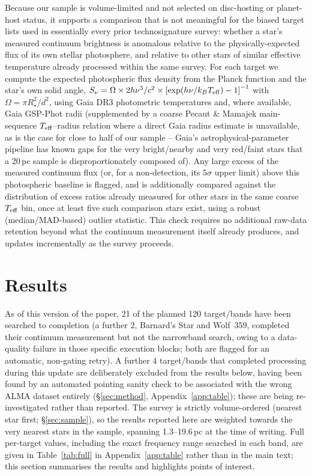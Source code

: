 \documentclass{openjournal}
\begin{document}
Because our sample is volume-limited and not selected on disc-hosting or
planet-host status, it supports a comparison that is not meaningful for
the biased target lists used in essentially every prior technosignature
survey: whether a star's measured continuum brightness is anomalous
relative to the physically-expected flux of its own stellar photosphere,
and relative to other stars of similar effective temperature already
processed within the same survey. For each target we compute the
expected photospheric flux density from the Planck function and the
star's own solid angle,
$S_\nu = \Omega \times 2h\nu^3/c^2 \times \left[\exp(h\nu/k_BT_{\rm eff}) - 1\right]^{-1}$
with $\Omega = \pi R_\star^2/d^2$, using Gaia DR3 photometric
temperatures and, where available, Gaia GSP-Phot radii (supplemented by a
coarse Pecaut \& Mamajek main-sequence $T_{\rm eff}$--radius relation
where a direct Gaia radius estimate is unavailable, as is the case for
close to half of our sample -- Gaia's astrophysical-parameter pipeline
has known gaps for the very bright/nearby and very red/faint stars that
a 20\,pc sample is disproportionately composed of). Any large excess of
the measured continuum flux (or, for a non-detection, its $5\sigma$ upper
limit) above this photospheric baseline is flagged, and is additionally
compared against the distribution of excess ratios already measured for
other stars in the same coarse $T_{\rm eff}$ bin, once at least five such
comparison stars exist, using a robust (median/MAD-based) outlier
statistic. This check requires no additional raw-data retention beyond
what the continuum measurement itself already produces, and updates
incrementally as the survey proceeds.

\section{Results}
\label{sec:results}

As of this version of the paper, 21 of the planned 120 target/bands have
been searched to completion (a further 2, Barnard's Star and Wolf~359,
completed their continuum measurement but not the narrowband search,
owing to a data-quality failure in those specific execution blocks; both
are flagged for an automatic, non-gating retry). A further 4 target/bands
that completed processing during this update are deliberately excluded
from the results below, having been found by an automated pointing sanity
check to be associated with the wrong ALMA dataset entirely
(\S\ref{sec:method}, Appendix~\ref{app:table}); these are being
re-investigated rather than reported. The survey is strictly
volume-ordered (nearest star first; \S\ref{sec:sample}), so the results
reported here are weighted towards the very nearest stars in the sample,
spanning 1.3--19.6\,pc at the time of writing. Full per-target values,
including the exact frequency range searched in each band, are given in
Table~\ref{tab:full} in Appendix~\ref{app:table} rather than in the main
text; this section summarises the results and highlights points of
interest.
\end{document}
